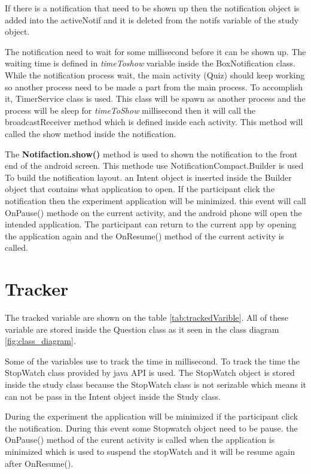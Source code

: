 If there  is a notification that need to be shown up then the notification object is added into the activeNotif and it is deleted from the notifs variable of the study object.

The notification need to wait for some millisecond before it can be shown up. The waiting time is defined in \textit{timeToshow} variable inside the BoxNotification class.
While the notification process wait, the main activity (Quiz) should keep working so another process need to be made a part from the main process. To accomplish it, TimerService class is used. This class will be spawn as another process and the process will be sleep for \textit{timeToShow} millisecond then it will call the broadcastReceiver method which is defined inside each activity.
This method will called  the show method inside the notification.

The \textbf{Notifaction.show()} method is used to shown the notification to the front end of the android screen. This methode use
 NotificationCompact.Builder is used To build the notification layout. an Intent object is inserted inside the Builder object that contains what application to open. If the participant click the notification then the experiment application will be minimized. this event will call OnPause() methode on the current activity, and the android phone will open the intended application. The participant can return to the current app by opening the application again and the OnResume() method  of the current activity is called.


\section{Tracker}

The tracked variable are shown on the table \ref{tab:trackedVarible}. All of these variable are stored inside the Question class as it seen in the class diagram \ref{fig:class_diagram}.

Some of the variables use to track the time in millisecond. To track the time the StopWatch class provided by java API is used. The StopWatch object is stored inside the study class because the StopWatch class is not serizable which means it can not be pass in the Intent object inside the Study class.

During the experiment the application will be minimized if the participant click the notification. During this event some Stopwatch object need to be pause. the OnPause() method of the curent activity is called when the application is minimized which is used to suspend the stopWatch and it will be resume again after OnResume().


